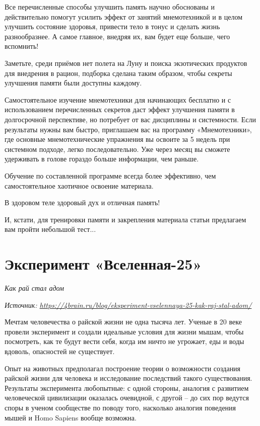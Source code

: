Все перечисленные способы улучшить память научно обоснованы и действительно помогут усилить эффект от занятий мнемотехникой и в целом улучшить состояние здоровья, привести тело в тонус и сделать жизнь разнообразнее. А самое главное, внедряя их, вам будет еще больше, чего вспомнить!

Заметьте, среди приёмов нет полета на Луну и поиска экзотических продуктов для внедрения в рацион, подборка сделана таким образом, чтобы секреты улучшения памяти были доступны каждому.

Самостоятельное изучение мнемотехники для начинающих бесплатно и с использованием перечисленных секретов даст эффект улучшения памяти в долгосрочной перспективе, но потребует от вас дисциплины и системности. Если результаты нужны вам быстро, приглашаем вас на программу «Мнемотехники», где основные мнемотехнические упражнения вы освоите за 5 недель при системном подходе, легко последовательно. Уже через месяц вы сможете удерживать в голове гораздо больше информации, чем раньше.

Обучение по составленной программе всегда более эффективно, чем самостоятельное хаотичное освоение материала.

В здоровом теле здоровый дух и отличная память!

И, кстати, для тренировки памяти и закрепления материала статьи предлагаем вам пройти небольшой тест...


\clearpage
\section{Эксперимент «Вселенная-25»}

\textit{Как рай стал адом}

\textit{Источник: \url{https://4brain.ru/blog/eksperiment-vselennaya-25-kak-raj-stal-adom/}}

Мечтам человечества о райской жизни не одна тысяча лет. Ученые в 20 веке провели эксперимент и создали идеальные условия для жизни мышам, чтобы посмотреть, как те будут вести себя, когда им ничто не угрожает, еды и воды вдоволь, опасностей не существует.

Опыт на животных предполагал построение теории о возможности создания райской жизни для человека и исследование последствий такого существования. Результаты эксперимента любопытные: с одной стороны, аналогия с развитием человеческой цивилизации оказалась очевидной, с другой – до сих пор ведутся споры в ученом сообществе по поводу того, насколько аналогия поведения мышей и Homo Sapiens вообще возможна.

